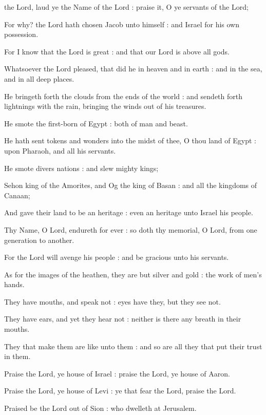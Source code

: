  the Lord, laud ye the Name of the Lord : praise it, O ye servants of the Lord;\par
{}
For why? the Lord hath chosen Jacob unto himself : and Israel for his own possession.\par
{}For I know that the Lord is great : and that our Lord is above all gods.\par
{}Whatsoever the Lord pleased, that did he in heaven and in earth : and in the sea, and in all deep places.\par
{}He bringeth forth the clouds from the ends of the world : and sendeth forth lightnings with the rain, bringing the winds out of his treasures.\par
{}He smote the first-born of Egypt : both of man and beast.\par
{}He hath sent tokens and wonders into the midst of thee, O thou land of Egypt : upon Pharaoh, and all his servants.\par
{}He smote divers nations : and slew mighty kings;\par
{}Sehon king of the Amorites, and Og the king of Basan : and all the kingdoms of Canaan;\par
{}And gave their land to be an heritage : even an heritage unto Israel his people.\par
{}Thy Name, O Lord, endureth for ever : so doth thy memorial, O Lord, from one generation to another.\par
{}For the Lord will avenge his people : and be gracious unto his servants.\par
{}As for the images of the heathen, they are but silver and gold : the work of men's hands.\par
{}They have mouths, and speak not : eyes have they, but they see not.\par
{}They have ears, and yet they hear not : neither is there any breath in their mouths.\par
{}They that make them are like unto them : and so are all they that put their trust in them.\par
{}Praise the Lord, ye house of Israel : praise the Lord, ye house of Aaron.\par
{}Praise the Lord, ye house of Levi : ye that fear the Lord, praise the Lord.\par
{}Praised be the Lord out of Sion : who dwelleth at Jerusalem.\par


